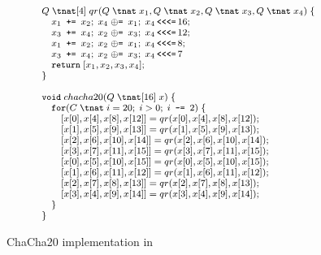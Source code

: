 \begin{figure}[t]
\[\footnotesize
\begin{array}{l}
Q\;\tnat[4]\;qr(Q\;\tnat\;x_1,Q\;\tnat\;x_2,Q\;\tnat\;x_3,Q\;\tnat\;x_4)\;\{
\\
\quad{x_1}\texttt{ += }{x_2};\; {x_4}{\; \oplus\texttt{= } }{x_1};\; x_4\,\texttt{<{}<{}<=}\,16;\\
\quad{x_3}\texttt{ += }{x_4};\; {x_2}{\; \oplus\texttt{= } }{x_3};\; x_4\,\texttt{<{}<{}<=}\,12;\\
\quad{x_1}\texttt{ += }{x_2};\; {x_2}{\; \oplus\texttt{= } }{x_1};\; x_4\,\texttt{<{}<{}<=}\,8;\\
\quad{x_3}\texttt{ += }{x_4};\; {x_2}{\; \oplus\texttt{= } }{x_3};\; x_4\,\texttt{<{}<{}<=}\,7\\
\quad\texttt{return}\;[x_1,x_2,x_3,x_4];\\
\}\\\\
\texttt{void}\;chacha20(Q\;\tnat[16]\;x)\;\{
\\
\quad\texttt{for}(C\;\tnat\;i=20;\;i>0;\;i \texttt{ -= } 2)\;\{\\
\qquad [x[0], x[4], x[8], x[12]] = qr(x[0], x[4], x[8], x[12]);\\
\qquad [x[1], x[5], x[9], x[13]] = qr(x[1], x[5], x[9], x[13]);\\
\qquad [x[2], x[6], x[10], x[14]] = qr(x[2], x[6], x[10], x[14]);\\
\qquad [x[3], x[7], x[11], x[15]] = qr(x[3], x[7], x[11], x[15]);\\
\qquad [x[0], x[5], x[10], x[15]] = qr(x[0], x[5], x[10], x[15]);\\
\qquad [x[1], x[6], x[11], x[12]] = qr(x[1], x[6], x[11], x[12]);\\
\qquad [x[2], x[7], x[8], x[13]] = qr(x[2], x[7], x[8], x[13]);\\
\qquad [x[3], x[4], x[9], x[14]] = qr(x[3], x[4], x[9], x[14]);\\
\quad\}\\
\}
\end{array}
\]
\caption{ChaCha20 implementation in \vqimp}
\label{fig:chacha-qr}
\end{figure}
